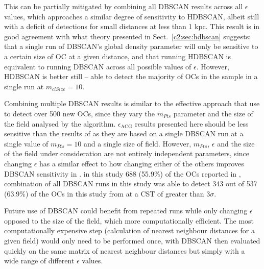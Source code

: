 This can be partially mitigated by combining all DBSCAN results across all $\epsilon$ values, which approaches a similar degree of sensitivity to HDBSCAN, albeit still with a deficit of detections for small distances at less than 1 kpc. This result is in good agreement with what theory presented in Sect.~\ref{c2:sec:hdbscan} suggests: that a single run of DBSCAN's global density parameter will only be sensitive to a certain size of OC at a given distance, and that running HDBSCAN is equivalent to running DBSCAN across all possible values of $\epsilon$. However, HDBSCAN is better still -- able to detect the majority of OCs in the sample in a single run at $m_{clSize}=10$. 

Combining multiple DBSCAN results is similar to the effective approach that \cite{castro-ginard_hunting_2020} use to detect over 500 new OCs, since they vary the $m_{Pts}$ parameter and the size of the field analysed by the algorithm. $\epsilon_{\text{ACG}}$ results presented here should be less sensitive than the results of \cite{castro-ginard_hunting_2020} as they are based on a single DBSCAN run at a single value of $m_{Pts}=10$ and a single size of field. However, $m_{Pts}$, $\epsilon$ and the size of the field under consideration are not entirely independent parameters, since changing $\epsilon$ has a similar effect to how changing either of the others improves DBSCAN sensitivity in \cite{castro-ginard_hunting_2020}. in this study \emph{} 688 (55.9\%) of the OCs reported in \cite{cantat-gaudin_gaia_2018}, combination of all DBSCAN runs in this study was able to detect 343 out of 537 (63.9\%) of the OCs in this study from \cite{cantat-gaudin_clusters_2020} at a CST of greater than 3$\sigma$.

Future use of DBSCAN could benefit from repeated runs while only changing $\epsilon$ opposed to the size of the field, which more computationally efficient. The most computationally expensive step (calculation of nearest neighbour distances for a given field) would only need to be performed once, with DBSCAN then evaluated quickly on the same matrix of nearest neighbour distances but simply with a wide range of different $\epsilon$ values. 

